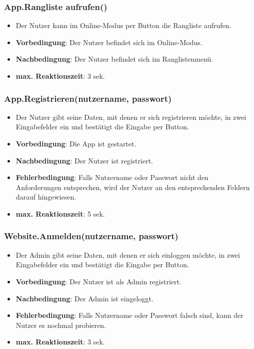 \documentclass[fontsize=12pt,paper=a4,twoside]{scrartcl}
\begin{document}
\subsubsection{App.Rangliste aufrufen()}
\begin{itemize}
\item Der Nutzer kann im Online-Modus per Button die Rangliste aufrufen.
\item \textbf{Vorbedingung}: Der Nutzer befindet sich im Online-Modus.
\item \textbf{Nachbedingung}: Der Nutzer befindet sich im Ranglistenmenü. 
\item \textbf{max. Reaktionszeit}: 3 sek.
\end{itemize}

\subsubsection{App.Registrieren(nutzername, passwort)}
\begin{itemize}
\item Der Nutzer gibt seine Daten, mit denen er sich registrieren möchte, in zwei Eingabefelder ein und bestätigt die Eingabe per Button.
\item \textbf{Vorbedingung}: Die App ist gestartet.
\item \textbf{Nachbedingung}: Der Nutzer ist registriert.
\item \textbf{Fehlerbedingung}: Falls Nutzername oder Passwort nicht den Anforderungen entsprechen, wird der Nutzer an den entsprechenden Feldern darauf hingewiesen.
\item \textbf{max. Reaktionszeit}: 5 sek.
\end{itemize}


\subsubsection{Website.Anmelden(nutzername, passwort)}
\begin{itemize}
\item Der Admin gibt seine Daten, mit denen er sich einloggen möchte, in zwei Eingabefelder ein und bestätigt die Eingabe per Button.
\item \textbf{Vorbedingung}: Der Nutzer ist als Admin registriert.
\item \textbf{Nachbedingung}: Der Admin ist eingeloggt.
\item \textbf{Fehlerbedingung}: Falls Nutzername oder Passwort falsch sind, kann der Nutzer es nochmal probieren.
\item \textbf{max. Reaktionszeit}: 3 sek.
\end{itemize}
\end{document}
